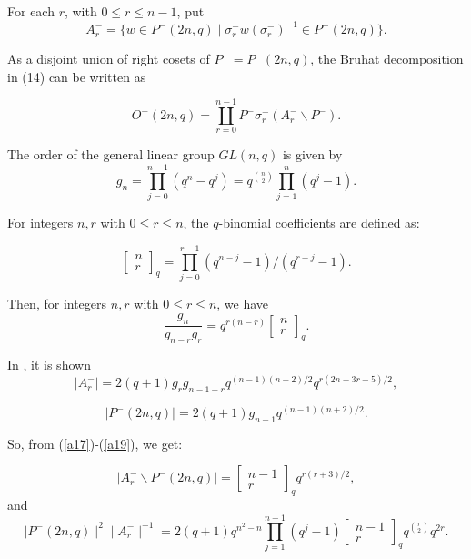 \documentclass[a4,12pt]{elsart}
\begin{document}
For each $r$, with $0\leq r \leq n-1$, put
\[
A^-_r = \{ w \in P^-(2n,q) \mid \sigma^-_rw(\sigma_r^-)^{-1} \in
P^-(2n,q) \}.
\]

As a disjoint union of right cosets of $P^-=P^-(2n,q)$, the Bruhat
decomposition in (14) can be written as

\begin{equation}\label{a15}
O^{-}(2n,q)= \coprod_{r=0}^{n-1}P^{-} \sigma _{r}^{-}(A _{r} ^{-}
\backslash P^{-}).
\end{equation}

The order of the general linear group $ GL(n,q)$ is given by
\begin{equation*}
g_n=\prod_{j=0}^{n-1}(q^n-q^j)=q^{\binom{n}{2}}\prod_{j=1}^{n}(q^{j}-1).
\end{equation*}

For integers $n,r$ with $0 \leq r \leq n$, the $q$-binomial
coefficients are defined as:

\begin{equation}\label{a16}
\left[ \substack{n \\ r}
 \right]_q = \prod_{j=0}^{r-1} (q^{n-j} - 1)/(q^{r-j} - 1).
 \end{equation}

Then, for integers $n,r$  with $0 \leq r \leq n$, we have
\begin{equation}\label{a17}
\frac{g_n}{g_{n-r} g_r} = q^{r(n-r)}\left[ \substack{n \\ r}
 \right]_q.
\end{equation}

 In \cite{DY}, it is shown
 \begin{equation}\label{a18}
\mid A^-_r \mid = 2(q+1)g_r g_{n-1-r}
q^{(n-1)(n+2)/2}q^{r(2n-3r-5)/2},
\end{equation}

\begin{equation}\label{a19}
\mid P^{-}(2n,q) \mid = 2(q+1)g_{n-1}q^{(n-1)(n+2)/2}.
\end{equation}

So, from (\ref{a17})-(\ref{a19}), we get:

\begin{equation}\label{a20}
\mid A^-_r\backslash P^-(2n,q) \mid = \left[ \substack{n-1\\ r}
 \right]_q q^{r(r+3)/2},
\end{equation}
and \begin{equation}\label{a21}
 \mid P^-(2n,q)\mid ^{2} \mid A_r^- \mid^{-1} =
2(q+1)q^{n^{2}-n}\prod_{j=1}^{n-1}(q^{j}-1)\left[ \substack{n-1 \\
r} \right]_q q^{{r \choose 2}}q^{2r}.
\end{equation}
\end{document}
